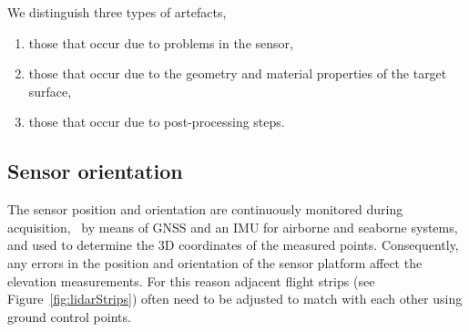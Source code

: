 We distinguish three types of artefacts, 
\begin{enumerate}
	\item those that occur due to problems in the sensor, 
	\item those that occur due to the geometry and material properties of the target surface, 
	\item those that occur due to post-processing steps.
\end{enumerate}


\subsection{Sensor orientation}
The sensor position and orientation are continuously monitored during acquisition, \eg\  by means of GNSS and an IMU for airborne and seaborne systems, and used to determine the 3D coordinates of the measured points. 
Consequently, any errors in the position and orientation of the sensor platform affect the elevation measurements. 
For this reason adjacent flight strips (see Figure~\ref{fig:lidarStrips}) often need to be adjusted to match with each other using ground control points. 
